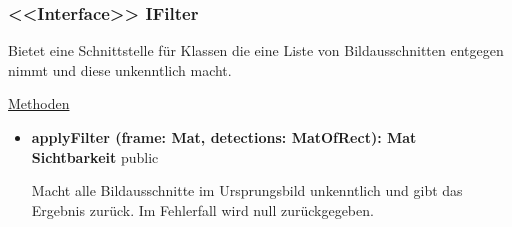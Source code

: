 \subsubsection{<<Interface>> IFilter} \label{service:klasse:IFilter}
Bietet eine Schnittstelle für Klassen die eine Liste von Bildausschnitten entgegen nimmt und diese unkenntlich macht. \newline

\underline{Methoden}
\begin{itemize}
\itemsep0pt
\item \textbf{applyFilter (frame: Mat, detections: MatOfRect): Mat}\hfill\\
\textbf{Sichtbarkeit} public

Macht alle Bildausschnitte im Ursprungsbild unkenntlich und gibt das Ergebnis zurück. Im Fehlerfall wird null zurückgegeben.

\end{itemize}